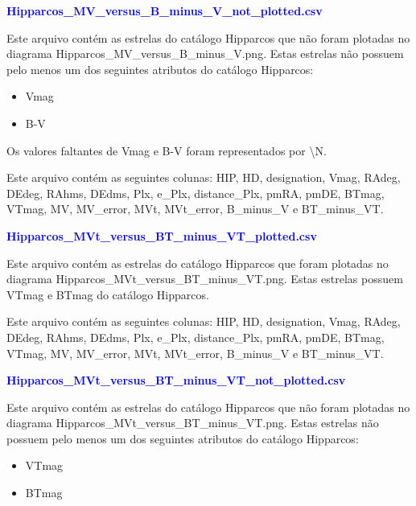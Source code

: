 \documentclass{article}
\begin{document}
	\vspace{10pt}
	
	\textcolor{blue}{\textbf{Hipparcos\_MV\_versus\_B\_minus\_V\_not\_plotted.csv}}
		
	\vspace{10pt}
	
	Este arquivo contém as estrelas do catálogo Hipparcos que não foram plotadas no diagrama Hipparcos\_MV\_versus\_B\_minus\_V.png. 
	Estas estrelas não possuem pelo menos um dos seguintes atributos do catálogo Hipparcos: 
	
	\begin{itemize}
		\item Vmag
		\item B-V
	\end{itemize}

	Os valores faltantes de Vmag e B-V foram representados por \textbackslash N.
	
	Este arquivo contém as seguintes colunas:
	HIP, HD, designation, Vmag, RAdeg, DEdeg, RAhms, DEdms, Plx, e\_Plx, distance\_Plx, pmRA, pmDE, BTmag, VTmag, MV, MV\_error, MVt, MVt\_error, B\_minus\_V e BT\_minus\_VT.
	
	\newpage
	
	\textcolor{blue}{\textbf{Hipparcos\_MVt\_versus\_BT\_minus\_VT\_plotted.csv}}
	
	\vspace{10pt}
	
	Este arquivo contém as estrelas do catálogo Hipparcos que foram plotadas no diagrama Hipparcos\_MVt\_versus\_BT\_minus\_VT.png.
	Estas estrelas possuem VTmag e BTmag do catálogo Hipparcos.
	
	Este arquivo contém as seguintes colunas:
	HIP, HD, designation, Vmag, RAdeg, DEdeg, RAhms, DEdms, Plx, e\_Plx, distance\_Plx, pmRA, pmDE, BTmag, VTmag, MV, MV\_error, MVt, MVt\_error, B\_minus\_V e BT\_minus\_VT.
	
	\vspace{10pt}
	
	\textcolor{blue}{\textbf{Hipparcos\_MVt\_versus\_BT\_minus\_VT\_not\_plotted.csv}}
	
	\vspace{10pt}
	
	Este arquivo contém as estrelas do catálogo Hipparcos que não foram plotadas no diagrama Hipparcos\_MVt\_versus\_BT\_minus\_VT.png.
	Estas estrelas não possuem pelo menos um dos seguintes atributos do catálogo Hipparcos: 
	
	\begin{itemize}
		\item VTmag
		\item BTmag
	\end{itemize}
\end{document}
